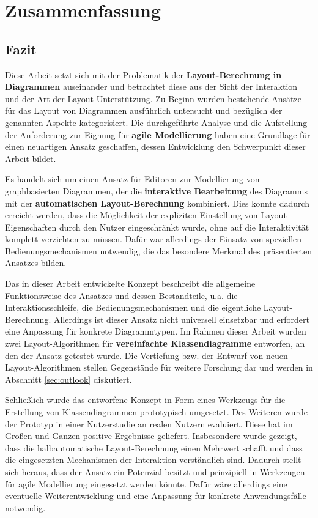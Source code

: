
\chapter{Zusammenfassung}
\label{chapter:summary}

\section{Fazit}

Diese Arbeit setzt sich mit der Problematik der \textbf{Layout-Berechnung in Diagrammen} auseinander und betrachtet diese aus der Sicht der Interaktion und der Art der Layout-Unterstützung. Zu Beginn wurden bestehende Ansätze für das Layout von Diagrammen ausführlich untersucht und bezüglich der genannten Aspekte kategorisiert. Die durchgeführte Analyse und die Aufstellung der Anforderung zur Eignung für \textbf{agile Modellierung} haben eine Grundlage für einen neuartigen Ansatz geschaffen, dessen Entwicklung den Schwerpunkt dieser Arbeit bildet.

Es handelt sich um einen Ansatz für Editoren zur Modellierung von graphbasierten Diagrammen, der die \textbf{interaktive Bearbeitung} des Diagramms mit der \textbf{automatischen Layout-Be\-rech\-nung} kombiniert. Dies konnte dadurch erreicht werden, dass die Möglichkeit der expliziten Einstellung von Layout-Eigenschaften durch den Nutzer eingeschränkt wurde, ohne auf die Interaktivität komplett verzichten zu müssen. Dafür war allerdings der Einsatz von speziellen Bedienungsmechanismen notwendig, die das besondere Merkmal des präsentierten Ansatzes bilden.

Das in dieser Arbeit entwickelte Konzept beschreibt die allgemeine Funktionsweise des Ansatzes und dessen Bestandteile, u.a. die Interaktionsschleife, die Bedienungsmechanismen und die eigentliche Layout-Berechnung. Allerdings ist dieser Ansatz nicht universell einsetzbar und erfordert eine Anpassung für konkrete Diagrammtypen. Im Rahmen dieser Arbeit wurden zwei Layout-Algorithmen für \textbf{vereinfachte Klassendiagramme} entworfen, an den der Ansatz getestet wurde. Die Vertiefung bzw. der Entwurf von neuen Layout-Algorithmen stellen Gegenstände für weitere Forschung dar und werden in Abschnitt \ref{sec:outlook} diskutiert.

Schließlich wurde das entworfene Konzept in Form eines Werkzeugs für die Erstellung von Klassendiagrammen prototypisch umgesetzt. Des Weiteren wurde der Prototyp in einer Nutzerstudie an realen Nutzern evaluiert. Diese hat im Großen und Ganzen positive Ergebnisse geliefert. Insbesondere wurde gezeigt, dass die halbautomatische Layout-Berechnung einen Mehrwert schafft und dass die eingesetzten Mechanismen der Interaktion verständlich sind. Dadurch stellt sich heraus, dass der Ansatz ein Potenzial besitzt und prinzipiell in Werkzeugen für agile Modellierung eingesetzt werden könnte. Dafür wäre allerdings eine eventuelle Weiterentwicklung und eine Anpassung für konkrete Anwendungsfälle notwendig.

